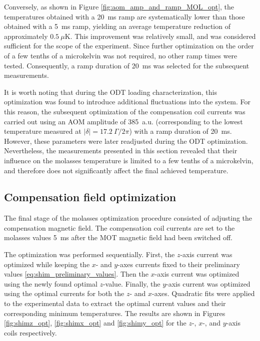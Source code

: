 Conversely, as shown in Figure \ref{fig:aom_amp_and_ramp_MOL_opt}, the temperatures obtained with a 20~ms ramp are systematically lower than those obtained with a 5~ms ramp, yielding an average temperature reduction of approximately $0.5~\mu\mathrm{K}$. This improvement was relatively small, and was considered sufficient for the scope of the experiment. Since further optimization on the order of a few tenths of a microkelvin was not required, no other ramp times were tested. Consequently, a ramp duration of 20~ms was selected for the subsequent measurements.

It is worth noting that during the ODT loading characterization, this optimization was found to introduce additional fluctuations into the system. For this reason, the subsequent optimization of the compensation coil currents was carried out using an AOM amplitude of 385~a.u. (corresponding to the lowest temperature measured at $|\delta|=17.2~\Gamma/2\pi$) with a ramp duration of 20~ms. However, these parameters were later readjusted during the ODT optimization. Nevertheless, the measurements presented in this section revealed that their influence on the molasses temperature is limited to a few tenths of a microkelvin, and therefore does not significantly affect the final achieved temperature.


\subsection{Compensation field optimization}
The final stage of the molasses optimization procedure consisted of adjusting the compensation magnetic field. The compensation coil currents are set to the molasses values 5~ms after the MOT magnetic field had been switched off.

The optimization was performed sequentially. First, the $z$-axis current was optimized while keeping the $x$- and $y$-axes currents fixed to their preliminary values \eqref{eq:shim_preliminary_values}. Then the $x$-axis current was optimized using the newly found optimal $z$-value. Finally, the $y$-axis current was optimized using the optimal currents for both the $z$- and $x$-axes. Quadratic fits were applied to the experimental data to extract the optimal current values and their corresponding minimum temperatures. The results are shown in Figures \ref{fig:shimz_opt}, \ref{fig:shimx_opt} and \ref{fig:shimy_opt} for the $z$-, $x$-, and $y$-axis coils respectively.

